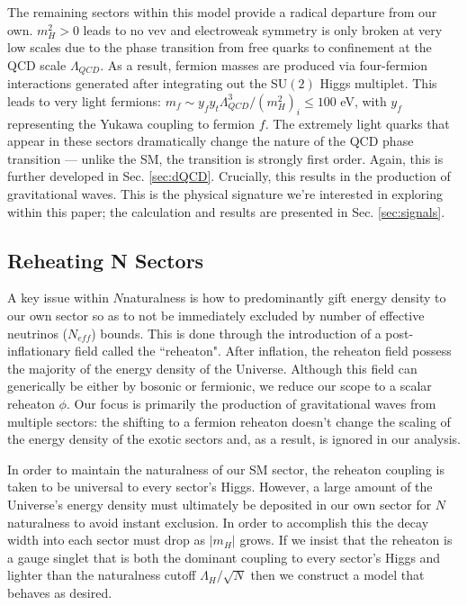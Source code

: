 \documentclass[nofootinbib,twocolumn,preprintnumbers]{revtex4-1}
\begin{document}
The remaining sectors within this model provide a radical departure from our own. $m_H^2 > 0$ leads to no vev and electroweak symmetry is only broken at very low scales due to the phase transition from free quarks to confinement at the QCD scale $\Lambda_{QCD}$. As a result, fermion masses are produced via four-fermion interactions generated after integrating out the SU$(2)$ Higgs multiplet. This leads to very light fermions: $m_f \sim y_f y_t \Lambda_{QCD}^3/(m^2_H)_i \leq 100$ eV, with $y_f$ representing the Yukawa coupling to fermion $f$. The extremely light quarks that appear in these sectors dramatically change the nature of the QCD phase transition --- unlike the SM, the transition is strongly first order. Again, this is further developed in Sec. \ref{sec:dQCD}. Crucially, this results in the production of gravitational waves. This is the physical signature we're interested in exploring within this paper; the calculation and results are presented in Sec. \ref{sec:signals}. 

\subsection{Reheating N Sectors}

A key issue within $N$naturalness is how to predominantly gift energy density to our own sector so as to not be immediately excluded by number of effective neutrinos ($N_{eff}$) bounds. This is done through the introduction of a post-inflationary field called the ``reheaton". After inflation, the reheaton field possess the majority of the energy density of the Universe. Although this field can generically be either by bosonic or fermionic, we reduce our scope to a scalar reheaton $\phi$. Our focus is primarily the production of gravitational waves from multiple sectors:  the shifting to a fermion reheaton doesn't change the scaling of the energy density of the exotic sectors  and, as a result, is ignored in our analysis.

In order to maintain the naturalness of our SM sector, the reheaton coupling is taken to be universal to every sector's Higgs. However, a large amount of the Universe's energy density must ultimately be deposited in our own sector for $N$naturalness to avoid instant exclusion. In order to accomplish this the decay width into each sector must drop as $\vert m_H\vert$ grows. If we insist that the reheaton is a gauge singlet that is both the dominant coupling to every sector's Higgs and lighter than the naturalness cutoff $\Lambda_H/\sqrt{N}$ then we construct a model that behaves as desired. 
\end{document}
